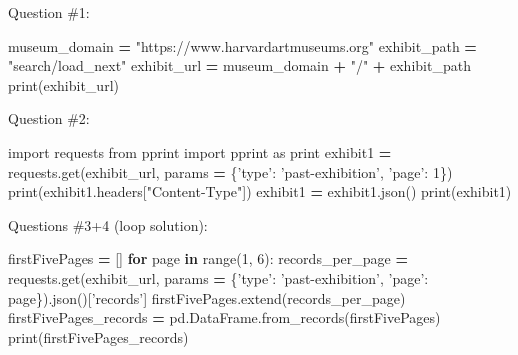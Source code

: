 \documentclass[]{book}
\newenvironment{Shaded}{\begin{snugshade}}{\end{snugshade}}
\newcommand{\KeywordTok}[1]{\textcolor[rgb]{0.13,0.29,0.53}{\textbf{#1}}}
\newcommand{\DecValTok}[1]{\textcolor[rgb]{0.00,0.00,0.81}{#1}}
\newcommand{\StringTok}[1]{\textcolor[rgb]{0.31,0.60,0.02}{#1}}
\newcommand{\ImportTok}[1]{#1}
\newcommand{\ControlFlowTok}[1]{\textcolor[rgb]{0.13,0.29,0.53}{\textbf{#1}}}
\newcommand{\OperatorTok}[1]{\textcolor[rgb]{0.81,0.36,0.00}{\textbf{#1}}}
\newcommand{\BuiltInTok}[1]{#1}
\newcommand{\NormalTok}[1]{#1}
\begin{document}
Question \#1:

\begin{Shaded}
\begin{Highlighting}[]
\NormalTok{museum_domain }\OperatorTok{=} \StringTok{"https://www.harvardartmuseums.org"}
\NormalTok{exhibit_path }\OperatorTok{=} \StringTok{"search/load_next"}
\NormalTok{exhibit_url }\OperatorTok{=}\NormalTok{ museum_domain }\OperatorTok{+} \StringTok{"/"} \OperatorTok{+}\NormalTok{ exhibit_path}
\BuiltInTok{print}\NormalTok{(exhibit_url)}
\end{Highlighting}
\end{Shaded}

Question \#2:

\begin{Shaded}
\begin{Highlighting}[]
\ImportTok{import}\NormalTok{ requests}
\ImportTok{from}\NormalTok{ pprint }\ImportTok{import}\NormalTok{ pprint }\ImportTok{as} \BuiltInTok{print} 
\NormalTok{exhibit1 }\OperatorTok{=}\NormalTok{ requests.get(exhibit_url, params }\OperatorTok{=}\NormalTok{ \{}\StringTok{'type'}\NormalTok{: }\StringTok{'past-exhibition'}\NormalTok{, }\StringTok{'page'}\NormalTok{: }\DecValTok{1}\NormalTok{\})}
\BuiltInTok{print}\NormalTok{(exhibit1.headers[}\StringTok{"Content-Type"}\NormalTok{])}
\NormalTok{exhibit1 }\OperatorTok{=}\NormalTok{ exhibit1.json()}
\BuiltInTok{print}\NormalTok{(exhibit1)}
\end{Highlighting}
\end{Shaded}

Questions \#3+4 (loop solution):

\begin{Shaded}
\begin{Highlighting}[]
\NormalTok{firstFivePages }\OperatorTok{=}\NormalTok{ []}
\ControlFlowTok{for}\NormalTok{ page }\KeywordTok{in} \BuiltInTok{range}\NormalTok{(}\DecValTok{1}\NormalTok{, }\DecValTok{6}\NormalTok{):}
\NormalTok{    records_per_page }\OperatorTok{=}\NormalTok{ requests.get(exhibit_url, params }\OperatorTok{=}\NormalTok{ \{}\StringTok{'type'}\NormalTok{: }\StringTok{'past-exhibition'}\NormalTok{, }\StringTok{'page'}\NormalTok{: page\}).json()[}\StringTok{'records'}\NormalTok{]}
\NormalTok{    firstFivePages.extend(records_per_page)}
\NormalTok{firstFivePages_records }\OperatorTok{=}\NormalTok{ pd.DataFrame.from_records(firstFivePages)}
\BuiltInTok{print}\NormalTok{(firstFivePages_records)}
\end{Highlighting}
\end{Shaded}
\end{document}
